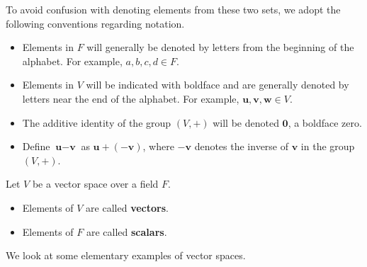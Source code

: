 To avoid confusion with denoting elements from these two sets, we adopt the following conventions regarding notation.
\begin{itemize}
    \item Elements in $F$ will generally be denoted by letters from the beginning of the alphabet. For example, $a, b, c, d \in F$.
    \item Elements in $V$ will be indicated with boldface and are generally denoted by letters near the end of the alphabet. For example, $\textbf{u}, \textbf{v}, \textbf{w} \in V$.
    \item The additive identity of the group $(V, +)$ will be denoted $\textbf{0}$, a boldface zero.
    \item Define $\textbf{u} - \textbf{v}$ as $\textbf{u} + (-\textbf{v})$, where $-\textbf{v}$ denotes the inverse of $\textbf{v}$ in the group $(V, +)$.
\end{itemize}

\begin{definition}
    Let $V$ be a vector space over a field $F$.
    \begin{itemize}
        \item Elements of $V$ are called \textbf{vectors}.
        \item Elements of $F$ are called \textbf{scalars}.
    \end{itemize}
\end{definition}

We look at some elementary examples of vector spaces.

